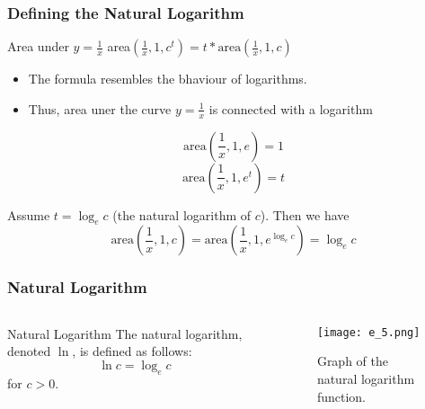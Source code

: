 \begin{frame}
  \frametitle{Defining the Natural Logarithm}
  \begin{block}{Area under \(y = \frac{1}{x}\)}
      area\((\frac{1}{x},1,c^{t}) = t*\text{area}(\frac{1}{x},1,c) \)
  \end{block}
  \begin{itemize}
    \item The formula resembles the bhaviour of logarithms.
    \item Thus, area uner the curve \(y = \frac{1}{x}\) is connected with a logarithm
  \end{itemize}
  \[\text{area}(\frac{1}{x},1,e) = 1 \]
\[\text{area}(\frac{1}{x},1,e^{t}) = t \]

Assume \(t = \log_e c\) (the natural logarithm of \(c\)). Then we have
\[\text{area}(\frac{1}{x},1,c) = \text{area}(\frac{1}{x},1,e^{\log_e c}) = \log_e c\]  
\end{frame}


\begin{frame}
  \frametitle{Natural Logarithm}
  \begin{columns}
    \begin{column}{0.5\textwidth}
      \begin{block}{Natural Logarithm}
        The natural logarithm, denoted \(\ln\), is defined as follows:
        \[
          \ln c = \log_e c
        \]
        for \(c > 0\).
      \end{block}
    \end{column}
    \begin{column}{0.5\textwidth}
      \begin{figure}
        \centering
        \texttt{[image: e\_5.png]}
        \caption{Graph of the natural logarithm function.}
      \end{figure}
    \end{column}
  \end{columns}
\end{frame}
